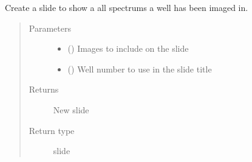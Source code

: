 \documentclass[letterpaper,10pt,english]{sphinxmanual}
\begin{document}
\begin{fulllineitems}
\begin{fulllineitems}
\label{\detokenize{polo.utils:polo.utils.io_utils.PptxWriter.add_multi_spectrum_slide}}
Create a slide to show a all spectrums a well has been
imaged in.
\begin{quote}\begin{description}
\item[{Parameters}] \leavevmode\begin{itemize}
\item {} 
 () \textendash{} Images to include on the slide

\item {} 
 () \textendash{} Well number to use in the slide title

\end{itemize}

\item[{Returns}] \leavevmode
New slide

\item[{Return type}] \leavevmode
slide

\end{description}\end{quote}

\end{fulllineitems}


\begin{fulllineitems}
\label{\detokenize{polo.utils:polo.utils.io_utils.PptxWriter.add_new_slide}}
\end{fulllineitems}



\end{fulllineitems}
\end{document}
